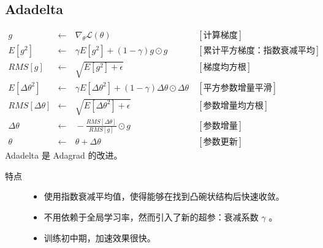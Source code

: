 \documentclass[letterpaper,10pt,english]{sphinxmanual}
\begin{document}
\subsection{Adadelta}
\label{\detokenize{deepLearning/08_optimizer:adadelta}}\begin{equation*}
\begin{split}g & \leftarrow &\ \nabla_{\theta} \mathcal{L}(\theta) &\  [\text{计算梯度}] \\
E[g^2] & \leftarrow &\ \gamma E[g^2] + (1 - \gamma) g \odot g  &\  [\text{累计平方梯度：指数衰减平均}] \\
RMS[g] & \leftarrow &\ \sqrt{E[g^2] + \epsilon} &\  [\text{梯度均方根}] \\
E[\Delta \theta^2] & \leftarrow &\ \gamma E[\Delta \theta^2] + (1 - \gamma) \Delta \theta \odot \Delta \theta  &\  [\text{平方参数增量平滑}] \\
RMS[\Delta \theta] & \leftarrow &\ \sqrt{E[\Delta \theta^2] + \epsilon} &\  [\text{参数增量均方根}] \\
\Delta \theta & \leftarrow &\  - \frac{RMS[\Delta \theta]}{RMS[g]} \odot g  &\ [\text{参数增量}] \\
\theta & \leftarrow &\  \theta + \Delta \theta &\ [\text{参数更新}]\end{split}
\end{equation*}
Adadelta 是 Adagrad 的改进。
\begin{description}
\item[{特点}] \leavevmode\begin{itemize}
\item {} 
使用指数衰减平均值，使得能够在找到凸碗状结构后快速收敛。

\item {} 
不用依赖于全局学习率，然而引入了新的超参：衰减系数 \(\gamma\) 。

\item {} 
训练初中期，加速效果很快。

\end{itemize}

\end{description}
\end{document}
